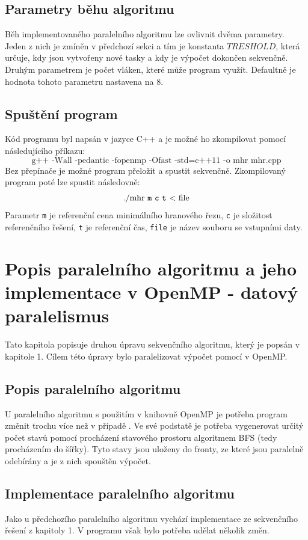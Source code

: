 \documentclass{article}
\begin{document}
\subsection{Parametry běhu algoritmu}

Běh implementovaného paralelního algoritmu lze ovlivnit dvěma parametry. Jeden z nich je zmíněn v předchozí sekci a tím je konstanta $TRESHOLD$, která určuje, kdy jsou vytvořeny nové tasky a kdy je výpočet dokončen sekvenčně. Druhým parametrem je počet vláken, které může program využít. Defaultně je hodnota tohoto parametru nastavena na 8.

\subsection{Spuštění program}
Kód programu byl napsán v jazyce C++ a je možné ho zkompilovat pomocí následujícího příkazu: $$\text{g++ -Wall -pedantic -fopenmp -Ofast -std=c++11 -o mhr mhr.cpp}$$ 
Bez přepínače  je možné program přeložit a spustit sekvenčně. Zkompilovaný program poté lze spustit následovně:
$$\text{./mhr \texttt{m} \texttt{c} \texttt{t} \textless \ file}$$
Parametr \texttt{m} je referenční cena minimálního hranového řezu, \texttt{c} je složitost referenčního řešení, \texttt{t} je referenční čas, \texttt{file} je název souboru se vstupními daty.  


\section{Popis paralelního algoritmu a jeho implementace v OpenMP - datový paralelismus}

Tato kapitola popisuje druhou úpravu sekvenčního algoritmu, který je popsán v kapitole 1. Cílem této úpravy bylo paralelizovat výpočet pomocí  v OpenMP.

\subsection{Popis paralelního algoritmu}

U paralelního algoritmu s použitím  v knihovně OpenMP je potřeba program změnit trochu více než v případě . Ve své podstatě je potřeba vygenerovat určitý počet stavů pomocí procházení stavového prostoru algoritmem BFS (tedy procházením do šířky). Tyto stavy jsou uloženy do fronty, ze které jsou paralelně odebírány a je z nich spouštěn výpočet. 

\subsection{Implementace paralelního algoritmu}
Jako u předchozího paralelního algoritmu vychází implementace  ze sekvenčního řešení z kapitoly 1. V programu však bylo potřeba udělat několik změn.
\end{document}
